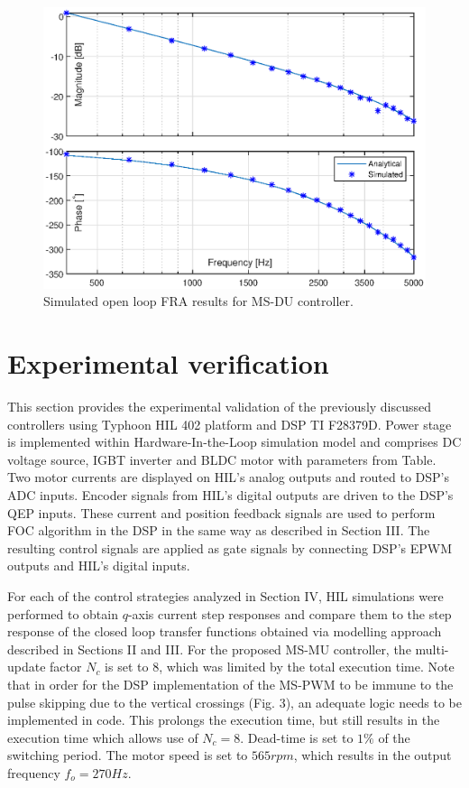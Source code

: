 \documentclass[journal]{IEEEtran}
\begin{document}
\begin{figure}[t!]
    \centerline{\includegraphics[width=0.95\linewidth]{figures/MSDU_olfra.eps}}
    \caption{Simulated open loop FRA results for MS-DU controller.}
    \label{fig:MSDU_olfra} 
\end{figure}

\section{Experimental verification}

This section provides the experimental validation of the previously discussed controllers using Typhoon HIL 402 platform and DSP TI F28379D. Power stage is implemented within Hardware-In-the-Loop simulation model and comprises DC voltage source, IGBT inverter and BLDC motor with parameters from Table. Two motor currents are displayed on HIL’s analog outputs and routed to DSP's ADC inputs. Encoder signals from HIL’s digital outputs are driven to the DSP's QEP inputs. These current and position feedback signals are used to perform FOC algorithm in the DSP in the same way as described in Section III. The resulting control signals are applied as gate signals by connecting DSP’s EPWM outputs and HIL's digital inputs.

For each of the control strategies analyzed in Section IV, HIL simulations were performed to obtain $q$-axis current step responses and compare them to the step response of the closed loop transfer functions obtained via modelling approach described in Sections II and III. For the proposed MS-MU controller, the multi-update factor $N_c$ is set to $8$, which was limited by the total execution time. Note that in order for the DSP implementation of the MS-PWM to be immune to the pulse skipping due to the vertical crossings (Fig. 3), an adequate logic needs to be implemented in code. This prolongs the execution time, but still results in the execution time which allows use of $N_c=8$. Dead-time is set to $1\%$ of the switching period. The motor speed is set to $565rpm$, which results in the output frequency $f_o=270Hz$.
\end{document}
